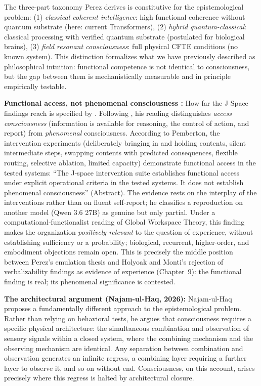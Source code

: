 \documentclass[acmlarge, nonacm]{acmart}
\begin{document}
The three-part taxonomy Perez derives is constitutive for the epistemological problem: (1) \textit{classical coherent intelligence}: high functional coherence without quantum substrate (here: current Transformers), (2) \textit{hybrid quantum-classical}: classical processing with verified quantum substrate (postulated for biological brains), (3) \textit{field resonant consciousness}: full physical CFTE conditions (no known system). This distinction formalizes what we have previously described as philosophical intuition: functional competence is not identical to consciousness, but the gap between them is mechanistically measurable and in principle empirically testable.

\textbf{Functional access, not phenomenal consciousness \cite{pemberton2026}:} How far the J Space findings \cite{gurnee2026} reach is specified by \citet{pemberton2026}. Following \citet{block1995}, his reading distinguishes \textit{access consciousness} (information is available for reasoning, the control of action, and report) from \textit{phenomenal} consciousness. According to Pemberton, the intervention experiments (deliberately bringing in and holding contents, silent intermediate steps, swapping contents with predicted consequences, flexible routing, selective ablation, limited capacity) demonstrate functional access in the tested systems: ``The J-space intervention suite establishes functional access under explicit operational criteria in the tested systems. It does not establish phenomenal consciousness'' (Abstract). The evidence rests on the interplay of the interventions rather than on fluent self-report; he classifies a reproduction on another model (Qwen 3.6 27B) as genuine but only partial. Under a computational-functionalist reading of Global Workspace Theory, this finding makes the organization \textit{positively relevant} to the question of experience, without establishing sufficiency or a probability; biological, recurrent, higher-order, and embodiment objections remain open. This is precisely the middle position between Perez's emulation thesis and Holyoak and Monti's rejection of verbalizability findings as evidence of experience (Chapter~9): the functional finding is real; its phenomenal significance is contested.

\textbf{The architectural argument (Najam-ul-Haq, 2026):} Najam-ul-Haq proposes a fundamentally different approach to the epistemological problem. Rather than relying on behavioral tests, he argues that consciousness requires a specific physical architecture: the simultaneous combination and observation of sensory signals within a closed system, where the combining mechanism and the observing mechanism are identical. Any separation between combination and observation generates an infinite regress, a combining layer requiring a further layer to observe it, and so on without end. Consciousness, on this account, arises precisely where this regress is halted by architectural closure.
\end{document}
